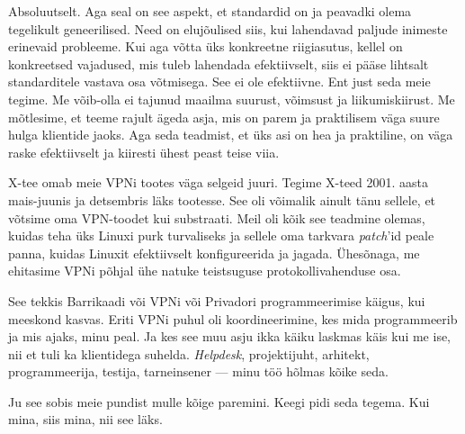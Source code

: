 
Absoluutselt. Aga seal on see aspekt, et standardid on ja peavadki olema 
tegelikult geneerilised. Need on elujõulised siis, kui lahendavad 
paljude inimeste erinevaid probleeme. Kui aga võtta üks konkreetne riigiasutus, kellel on konkreetsed vajadused, mis tuleb 
lahendada efektiivselt, siis ei pääse lihtsalt 
standarditele vastava osa võtmisega. See ei ole efektiivne. Ent
just seda meie tegime. Me 
võib-olla ei tajunud maailma suurust, võimsust ja liikumiskiirust. 
Me mõtlesime, et teeme rajult 
ägeda asja, mis on parem ja praktilisem väga suure 
hulga klientide jaoks. Aga seda teadmist, et üks asi on hea ja praktiline,  
on väga raske efektiivselt ja kiiresti ühest peast teise viia.  


X-tee omab meie VPNi tootes väga selgeid 
juuri. Tegime X-teed 2001. aasta mais-juunis ja detsembris läks tootesse. 
See oli võimalik ainult tänu sellele, et võtsime oma VPN-toodet kui 
substraati. Meil oli kõik see teadmine olemas, kuidas teha üks Linuxi purk 
turvaliseks ja sellele oma tarkvara 
\emph{patch}'id peale panna, kuidas Linuxit efektiivselt konfigureerida ja jagada. Ühesõnaga, me ehitasime VPNi põhjal ühe natuke teistsuguse 
protokollivahenduse osa. 


See tekkis Barrikaadi või VPNi või Privadori 
programmeerimise käigus, kui meeskond kasvas. Eriti VPNi puhul oli
koordineerimine, kes mida programmeerib ja mis ajaks, minu peal. Ja kes see muu asju ikka käiku laskmas käis kui me 
ise, nii et tuli ka klientidega suhelda. \emph{Helpdesk}, 
projektijuht, arhitekt, programmeerija, testija, tarneinsener --- minu töö hõlmas kõike seda. 


Ju see sobis meie pundist mulle kõige paremini. Keegi pidi seda tegema. Kui mina, siis mina, nii see läks.

